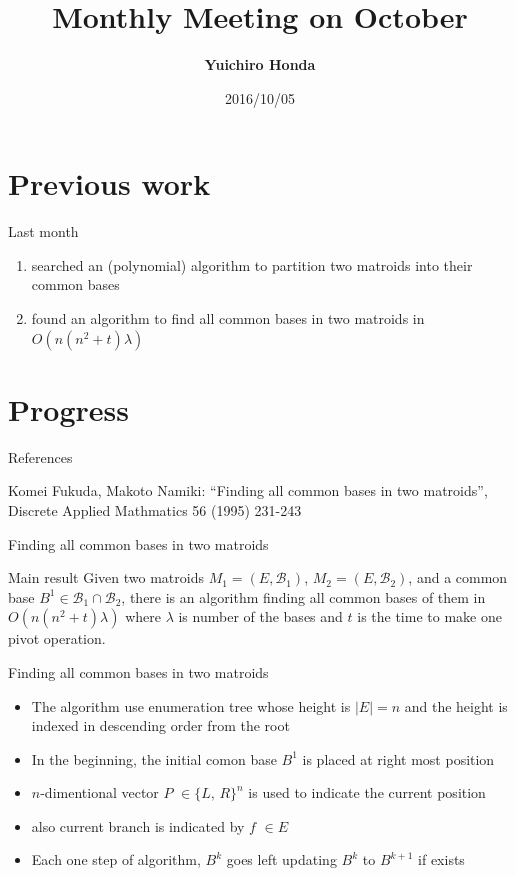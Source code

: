 \documentclass[11pt,xcolor=dvipsnames,table,dvipdfmx]{beamer}
\title{Monthly Meeting on October}
\author{\textbf{Yuichiro Honda}}
\date{2016/10/05}
\institute{Morita lab. M1}
\begin{document}
\maketitle

\section{Previous work}
\begin{frame}{Last month}
 \begin{enumerate}
  \item searched an (polynomial) algorithm to partition two matroids into their common bases
  \item found an algorithm to find all common bases in two matroids in $O(n(n^2+t)\lambda)$
 \end{enumerate}
\end{frame}



\section{Progress}
\begin{frame}{References}
 \begin{thebibliography}{9}
	\small{Komei Fukuda, Makoto Namiki: ``Finding all common bases in two matroids'', Discrete Applied Mathmatics 56 (1995) 231-243}
 \end{thebibliography}
\end{frame}

\begin{frame}{Finding all common bases in two matroids}
 \begin{block}{Main result}
  Given two matroids $M_1 = (E, \mathcal{B}_1)$, $M_2 = (E, \mathcal{B}_2)$, and a common base $B^1 \in \mathcal{B}_1 \cap \mathcal{B}_2$, there is an algorithm finding all common bases of them in \alert{$O(n(n^2+t)\lambda)$ }where $\lambda$ is number of the bases and $t$ is the time to make one pivot operation.
 \end{block}
\end{frame}

\begin{frame}{Finding all common bases in two matroids}
 \begin{itemize}
  \item The algorithm use enumeration tree whose height is $|E| = n$ and the height is indexed in descending order from the root
  \item In the beginning, the initial comon base $B^1$ is placed at right most position
  \item $n$-dimentional vector \alert{$P$} $\in \{L,\,R\}^n$ is used to indicate the current position
  \item also current branch is indicated by \alert{$f$} $\in E$
  \item Each one step of algorithm, \alert{$B^k$} goes left updating $B^k$ to $B^{k+1}$ if exists
 \end{itemize}
\end{frame}
\end{document}
